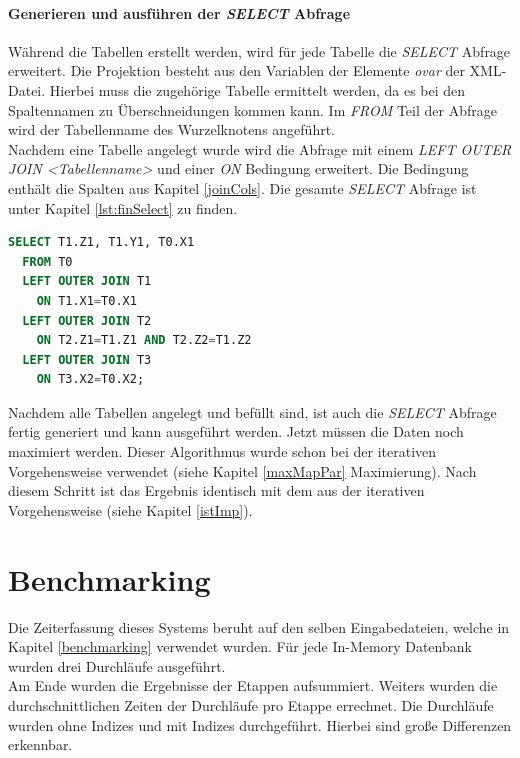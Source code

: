 \documentclass[draft,final]{vutinfth} %
\begin{document}
\paragraph{Generieren und ausführen der \textit{SELECT} Abfrage}
Während die Tabellen erstellt werden, wird für jede Tabelle die \textit{SELECT} Abfrage erweitert. Die Projektion besteht aus den Variablen der Elemente \textit{ovar} der XML-Datei. Hierbei muss die zugehörige Tabelle ermittelt werden, da es bei den Spaltennamen zu Überschneidungen kommen kann. Im \textit{FROM} Teil der Abfrage wird der Tabellenname des Wurzelknotens angeführt. \\
Nachdem eine Tabelle angelegt wurde wird die Abfrage mit einem \textit{LEFT OUTER JOIN <Tabellenname>} und einer \textit{ON} Bedingung erweitert. Die Bedingung enthält die Spalten aus Kapitel \ref{joinCols}. Die gesamte \textit{SELECT} Abfrage ist unter Kapitel \ref{lst:finSelect} zu finden.

\begin{lstlisting}[language=SQL,label={lst:finSelect},caption={SELECT Abfrage},frame = single]
SELECT T1.Z1, T1.Y1, T0.X1
  FROM T0
  LEFT OUTER JOIN T1
	ON T1.X1=T0.X1 
  LEFT OUTER JOIN T2
	ON T2.Z1=T1.Z1 AND T2.Z2=T1.Z2 
  LEFT OUTER JOIN T3
	ON T3.X2=T0.X2;
\end{lstlisting}

Nachdem alle Tabellen angelegt und befüllt sind, ist auch die \textit{SELECT} Abfrage fertig generiert und kann ausgeführt werden. Jetzt müssen die Daten noch maximiert werden. Dieser Algorithmus wurde schon bei der iterativen Vorgehensweise verwendet (siehe Kapitel \ref{maxMapPar} Maximierung). Nach diesem Schritt ist das Ergebnis identisch mit dem aus der iterativen Vorgehensweise (siehe Kapitel \ref{istImp}).

\section{Benchmarking} \label{benchNeu}
Die Zeiterfassung dieses Systems beruht auf den selben Eingabedateien, welche in Kapitel \ref{benchmarking} verwendet wurden. Für jede In-Memory Datenbank wurden drei Durchläufe ausgeführt. \\
Am Ende wurden die Ergebnisse der Etappen aufsummiert. Weiters wurden die durchschnittlichen Zeiten der Durchläufe pro Etappe errechnet. Die Durchläufe wurden ohne Indizes und mit Indizes durchgeführt. Hierbei sind gro\ss e Differenzen erkennbar.
\end{document}
